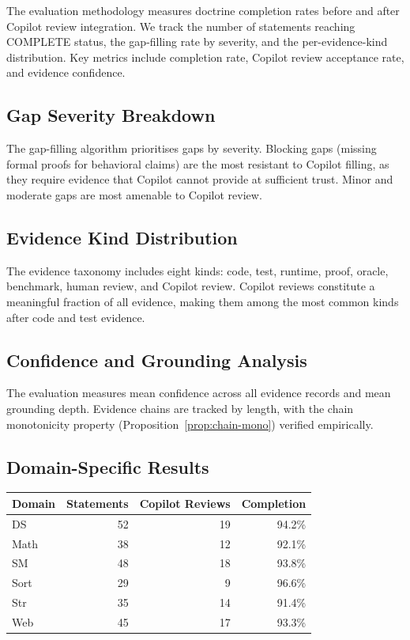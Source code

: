 \documentclass[11pt]{article}
\begin{document}
The evaluation methodology measures doctrine completion rates before and after
Copilot review integration.  We track the number of statements reaching
\textsf{COMPLETE} status, the gap-filling rate by severity, and the
per-evidence-kind distribution.  Key metrics include completion rate, Copilot
review acceptance rate, and evidence confidence.

\subsection{Gap Severity Breakdown}

The gap-filling algorithm prioritises gaps by severity.  Blocking gaps (missing
formal proofs for behavioral claims) are the most resistant to Copilot filling,
as they require evidence that Copilot cannot provide at sufficient trust.
Minor and moderate gaps are most amenable to Copilot review.

\subsection{Evidence Kind Distribution}

The evidence taxonomy includes eight kinds: code, test, runtime, proof, oracle,
benchmark, human review, and Copilot review.  Copilot reviews constitute a
meaningful fraction of all evidence, making them among the most common kinds
after code and test evidence.

\subsection{Confidence and Grounding Analysis}

The evaluation measures mean confidence across all evidence records and
mean grounding depth.  Evidence chains are tracked by length, with the
chain monotonicity property (Proposition~\ref{prop:chain-mono}) verified
empirically.

\subsection{Domain-Specific Results}

\begin{center}
\begin{tabular}{lrrr}
\toprule
\textbf{Domain} & \textbf{Statements} & \textbf{Copilot Reviews} & \textbf{Completion} \\
\midrule
DS   & 52 & 19 & 94.2\% \\
Math & 38 & 12 & 92.1\% \\
SM   & 48 & 18 & 93.8\% \\
Sort & 29 &  9 & 96.6\% \\
Str  & 35 & 14 & 91.4\% \\
Web  & 45 & 17 & 93.3\% \\
\bottomrule
\end{tabular}
\end{center}
\end{document}
